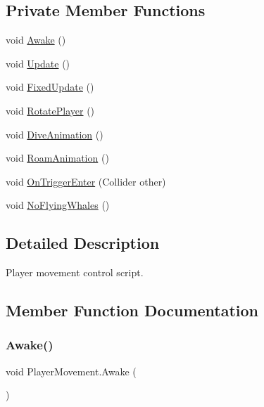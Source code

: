 \subsection*{Private Member Functions}
\begin{DoxyCompactItemize}
\item 
void \hyperlink{class_player_movement_a589e2f9da48918ca04fea0c418f46d32}{Awake} ()
\item 
void \hyperlink{class_player_movement_aaf9b77d7177d538be9c1447d08191322}{Update} ()
\item 
void \hyperlink{class_player_movement_a0caaa871b9ef680c9f02bd0e22c77db1}{Fixed\+Update} ()
\item 
void \hyperlink{class_player_movement_af5abbfc3a23ae53153afb7fc46588770}{Rotate\+Player} ()
\item 
void \hyperlink{class_player_movement_a7e49eea241ab7a3b11125c33aae4b12d}{Dive\+Animation} ()
\item 
void \hyperlink{class_player_movement_a96683270dabdb0389c014c436aaf3cb6}{Roam\+Animation} ()
\item 
void \hyperlink{class_player_movement_a0d2a1162c4cc3a5d4be939d00368c6e3}{On\+Trigger\+Enter} (Collider other)
\item 
void \hyperlink{class_player_movement_a49aa6a80bb76113ff3702536ea1b46de}{No\+Flying\+Whales} ()
\end{DoxyCompactItemize}


\subsection{Detailed Description}
Player movement control script. 



\subsection{Member Function Documentation}
\mbox{\label{class_player_movement_a589e2f9da48918ca04fea0c418f46d32}} 
\subsubsection{\texorpdfstring{Awake()}{Awake()}}
{\footnotesize\ttfamily void Player\+Movement.\+Awake (\begin{DoxyParamCaption}{ }\end{DoxyParamCaption})\hspace{0.3cm}{\ttfamily [private]}}



